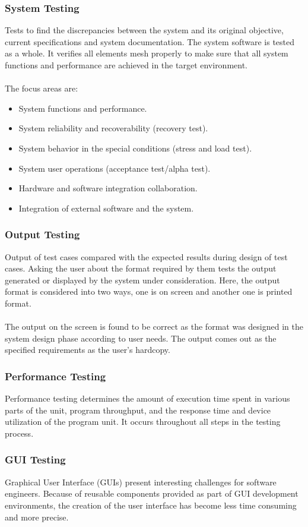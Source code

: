 \documentclass[oneside, 12pt]{book}
\begin{document}
			\subsubsection{System Testing}
				Tests to find the discrepancies between the system and its original objective, current specifications and system documentation. The system software is tested as a whole. It verifies all elements mesh properly to make sure that all system functions and performance are achieved in the target environment.
				\\\\The focus areas are:
				\begin{itemize}
					\item System functions and performance.
					\item System reliability and recoverability (recovery test).
					\item System behavior in the special conditions (stress and load test).
					\item System user operations (acceptance test/alpha test).
					\item Hardware and software integration collaboration.
					\item Integration of external software and the system.
				\end{itemize}
			\subsubsection{Output Testing}
				Output of test cases compared with the expected results during design of test cases. Asking the user about the format required by them tests the output generated or displayed by the system under consideration. Here, the output format is considered into two ways, one is on screen and another one is printed format.
				\\\\The output on the screen is found to be correct as the format was designed in the system design phase according to user needs. The output comes out as the specified requirements as the user’s hardcopy.
			\subsubsection{Performance Testing}
				Performance testing determines the amount of execution time spent in various parts of the unit, program throughput, and the response time and device utilization of the program unit. It occurs throughout all steps in the testing process.
			\subsubsection{GUI Testing}
				Graphical User Interface (GUIs) present interesting challenges for software engineers. Because of reusable components provided as part of GUI development environments, the creation of the user interface has become less time consuming and more precise.
	\newpage
\end{document}
